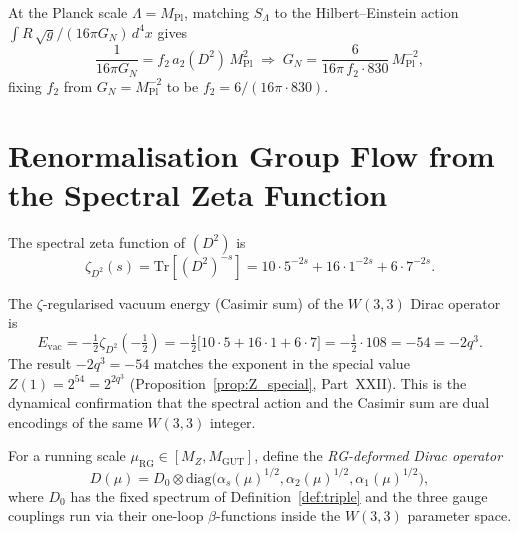 \begin{corollary}
\label{cor:newton}
At the Planck scale $\Lambda=M_\mathrm{Pl}$, matching $S_\Lambda$ to the
Hilbert--Einstein action $\int R\,\sqrt{g}/(16\pi G_N)\,d^4x$ gives
\begin{equation}
  \frac{1}{16\pi G_N} = f_2\,a_2(D^2)\,M_\mathrm{Pl}^2
  \;\Longrightarrow\;
  G_N = \frac{6}{16\pi\,f_2\cdot 830}\,M_\mathrm{Pl}^{-2},
  \label{eq:GN_pred}
\end{equation}
fixing $f_2$ from $G_N=M_\mathrm{Pl}^{-2}$ to be
$f_2 = 6/(16\pi\cdot 830)$.
\end{corollary}

\section{Renormalisation Group Flow from the Spectral Zeta Function}
\label{sec:rg_flow}

\begin{definition}
\label{def:spec_zeta}
The spectral zeta function of $(D^2)$ is
\begin{equation}
  \zeta_{D^2}(s) = \mathrm{Tr}[(D^2)^{-s}]
    = 10\cdot 5^{-2s}+16\cdot 1^{-2s}+6\cdot 7^{-2s}.
  \label{eq:spec_zeta}
\end{equation}
\end{definition}

\begin{proposition}
\label{prop:vac_energy}
The $\zeta$-regularised vacuum energy (Casimir sum) of the $W(3,3)$ Dirac
operator is
\begin{equation}
  E_\mathrm{vac} = -\tfrac{1}{2}\zeta_{D^2}(-\tfrac{1}{2})
    = -\tfrac{1}{2}\bigl[10\cdot 5 + 16\cdot 1 + 6\cdot 7\bigr]
    = -\tfrac{1}{2}\cdot 108
    = -54 = -2q^3.
  \label{eq:vac_energy}
\end{equation}
The result $-2q^3=-54$ matches the exponent in the special value
$Z(1)=2^{54}=2^{2q^3}$ (Proposition~\ref{prop:Z_special}, Part~XXII).
This is the dynamical confirmation that the spectral action and the
Casimir sum are dual encodings of the same $W(3,3)$ integer.
\end{proposition}

\begin{definition}
\label{def:rg_lift}
For a running scale $\mu_\mathrm{RG}\in[M_Z,M_\mathrm{GUT}]$, define
the \emph{RG-deformed Dirac operator}
\begin{equation}
  D(\mu) = D_0 \otimes \mathrm{diag}\!\bigl(\alpha_s(\mu)^{1/2},
    \alpha_2(\mu)^{1/2},\alpha_1(\mu)^{1/2}\bigr),
  \label{eq:D_mu}
\end{equation}
where $D_0$ has the fixed spectrum of Definition~\ref{def:triple} and the
three gauge couplings run via their one-loop $\beta$-functions inside the
$W(3,3)$ parameter space.
\end{definition}

